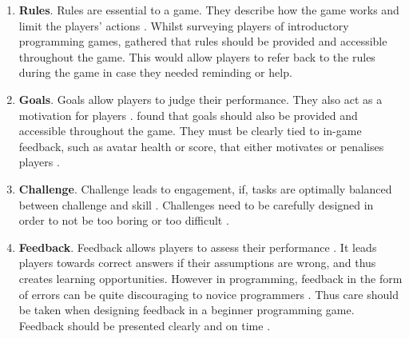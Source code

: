 \documentclass[a4paper,11.5pt]{report}
\numberwithin{figure}{section}
\numberwithin{table}{section}
\numberwithin{equation}{section}
\numberwithin{equation}{section}
\begin{document}
\begin{enumerate}
	\item \textbf{Rules}. Rules are essential to a game. They describe how the game works and limit the players' actions \citep{roungas2015}. Whilst surveying players of introductory programming games, \citet{Barnes2007} gathered that rules should be provided and accessible throughout the game. This would allow players to refer back to the rules during the game in case they needed reminding or help.

	\item \textbf{Goals}. Goals allow players to judge their performance. They also act as a motivation for players \citep{roungas2015}. \citep{Barnes2007} found that goals should also be provided and accessible throughout the game. They must be clearly tied to in-game feedback, such as avatar health or score, that either motivates or penalises players \citep{Barnes2007}.
	
	\item \textbf{Challenge}. Challenge leads to engagement, if, tasks are optimally balanced between challenge and skill \citep{whitton2011,flow}. Challenges need to be carefully designed in order to not be too boring or too difficult \citep{roungas2015}.
	
	\item \textbf{Feedback}. Feedback allows players to assess their performance \citep{roungas2015}. It leads players towards correct answers if their assumptions are wrong, and thus creates learning opportunities. However in programming, feedback in the form of errors can be quite discouraging to novice programmers \citep{lee2011}. Thus care should be taken when designing feedback in a beginner programming game. Feedback should be presented clearly and on time \citep{roungas2015}.
\end{enumerate}











\end{document}

